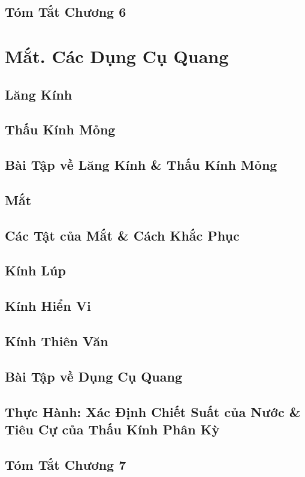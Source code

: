 \documentclass[oneside]{book}
\numberwithin{equation}{section}
\begin{document}
\section{Tóm Tắt Chương 6}


\chapter{Mắt. Các Dụng Cụ Quang}

\section{Lăng Kính}

\section{Thấu Kính Mỏng}

\section{Bài Tập về Lăng Kính \& Thấu Kính Mỏng}

\section{Mắt}

\section{Các Tật của Mắt \& Cách Khắc Phục}

\section{Kính Lúp}

\section{Kính Hiển Vi}

\section{Kính Thiên Văn}

\section{Bài Tập về Dụng Cụ Quang}

\section{Thực Hành: Xác Định Chiết Suất của Nước \& Tiêu Cự của Thấu Kính Phân Kỳ}

\section{Tóm Tắt Chương 7}


\printbibliography[heading=bibintoc]
	
\end{document}
